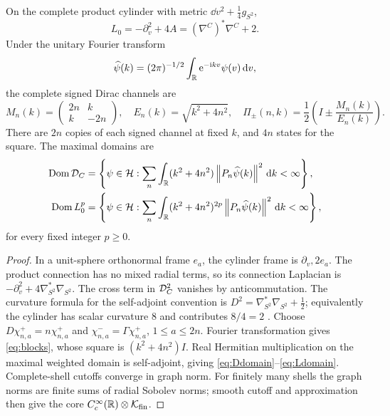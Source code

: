 \begin{proposition}
\label{prop:spectrum}
On the complete product cylinder with metric
$\dd v^2+\tfrac14g_{S^2}$,
\begin{equation}\label{eq:curvature}
 L_0=-\partial_v^2+4A=(\nabla^C)^*\nabla^C+2.
\end{equation}
Under the unitary Fourier transform
\begin{equation}\label{eq:fourier}
 \widehat\psi(k)=(2\pi)^{-1/2}\int_\mathbb R\mathrm e^{-\mathrm i kv}\psi(v)\,\mathrm d v,
\end{equation}
the complete signed Dirac channels are
\begin{equation}\label{eq:blocks}
 M_n(k)=\begin{pmatrix}2n&k\\k&-2n\end{pmatrix},\quad
 E_n(k)=\sqrt{k^2+4n^2},\quad
 \Pi_\pm(n,k)=\frac12\left(I\pm\frac{M_n(k)}{E_n(k)}\right).
\end{equation}
There are $2n$ copies of each signed channel at fixed $k$, and $4n$
states for the square. The maximal domains are
\begin{align}
 \operatorname{Dom}\mathcal D_C&=\left\{\psi\in\mathcal H:
 \sum_n\int_\mathbb R(k^2+4n^2)\left\lVert P_n\widehat\psi(k)\right\rVert^2\,\mathrm d k<\infty\right\},
 \label{eq:Ddomain}\\
 \operatorname{Dom} L_0^p&=\left\{\psi\in\mathcal H:
 \sum_n\int_\mathbb R(k^2+4n^2)^{2p}\left\lVert P_n\widehat\psi(k)\right\rVert^2\,\mathrm d k<\infty\right\},
 \label{eq:Ldomain}
\end{align}
for every fixed integer $p\ge0$.
\end{proposition}
\begin{proof}
In a unit-sphere orthonormal frame $e_a$, the cylinder frame is
$\partial_v,2e_a$. The product connection has no mixed radial terms, so
its connection Laplacian is
$-\partial_v^2+4\nabla_{S^2}^*\nabla_{S^2}$.
The cross term in $\mathcal D_C^2$ vanishes by anticommutation.
The curvature formula for the self-adjoint convention is
$D^2=\nabla_{S^2}^*\nabla_{S^2}+\tfrac12$; equivalently the cylinder
has scalar curvature $8$ and contributes $8/4=2$
\cite[(5.35)--(5.36)]{CamporesiHiguchi1996}.
Choose $D\chi^+_{n,a}=n\chi^+_{n,a}$ and
$\chi^-_{n,a}=\Gamma\chi^+_{n,a}$, $1\le a\le2n$.
Fourier transformation gives \eqref{eq:blocks}, whose square is
$(k^2+4n^2)I$. Real Hermitian multiplication on the maximal weighted
domain is self-adjoint, giving \eqref{eq:Ddomain}--\eqref{eq:Ldomain}.
Complete-shell cutoffs converge in graph norm. For finitely many shells
the graph norms are finite sums of radial Sobolev norms; smooth cutoff
and approximation then give the core
$C_c^\infty(\mathbb R)\otimes\mathcal K_{\rm fin}$.
\end{proof}

